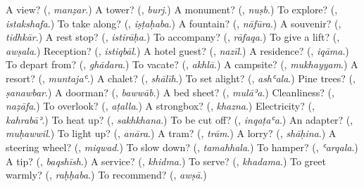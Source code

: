 \begin{tcolorbox}[breakable,colback=teal!4,colframe=teal!35!black,title={Before you move on}]
A view? (\textbf{}, \emph{manẓar}.) A tower? (\textbf{}, \emph{burj}.) A monument? (\textbf{}, \emph{nuṣb}.) To explore? (\textbf{}, \emph{istakshafa}.) To take along? (\textbf{}, \emph{iṣṭaḥaba}.) A fountain? (\textbf{}, \emph{nāfūra}.) A souvenir? (\textbf{}, \emph{tidhkār}.) A rest stop? (\textbf{}, \emph{istirāḥa}.) To accompany? (\textbf{}, \emph{rāfaqa}.) To give a lift? (\textbf{}, \emph{awṣala}.) Reception? (\textbf{}, \emph{istiqbāl}.) A hotel guest? (\textbf{}, \emph{nazīl}.) A residence? (\textbf{}, \emph{iqāma}.) To depart from? (\textbf{}, \emph{ghādara}.) To vacate? (\textbf{}, \emph{akhlā}.) A campsite? (\textbf{}, \emph{mukhayyam}.) A resort? (\textbf{}, \emph{muntajaʿ}.) A chalet? (\textbf{}, \emph{shālīh}.) To set alight? (\textbf{}, \emph{ashʿala}.) Pine trees? (\textbf{}, \emph{ṣanawbar}.) A doorman? (\textbf{}, \emph{bawwāb}.) A bed sheet? (\textbf{}, \emph{mulāʾa}.) Cleanliness? (\textbf{}, \emph{naẓāfa}.) To overlook? (\textbf{}, \emph{aṭalla}.) A strongbox? (\textbf{}, \emph{khazna}.) Electricity? (\textbf{}, \emph{kahrabāʾ}.) To heat up? (\textbf{}, \emph{sakhkhana}.) To be cut off? (\textbf{}, \emph{inqaṭaʿa}.) An adapter? (\textbf{}, \emph{muḥawwil}.) To light up? (\textbf{}, \emph{anāra}.) A tram? (\textbf{}, \emph{trām}.) A lorry? (\textbf{}, \emph{shāḥina}.) A steering wheel? (\textbf{}, \emph{miqwad}.) To slow down? (\textbf{}, \emph{tamahhala}.) To hamper? (\textbf{}, \emph{ʿarqala}.) A tip? (\textbf{}, \emph{baqshīsh}.) A service? (\textbf{}, \emph{khidma}.) To serve? (\textbf{}, \emph{khadama}.) To greet warmly? (\textbf{}, \emph{raḥḥaba}.) To recommend? (\textbf{}, \emph{awṣā}.)
\end{tcolorbox}
